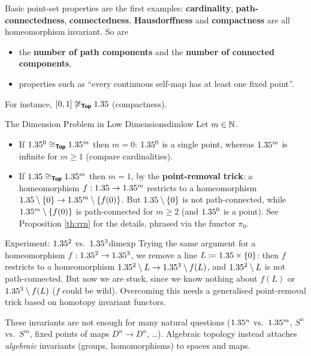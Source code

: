 Basic point-set properties are the first examples: \textbf{cardinality}, \textbf{path-connectedness}, \textbf{connectedness}, \textbf{Hausdorffness} and \textbf{compactness} are all homeomorphism invariant. So are
\begin{itemize}
    \item the \textbf{number of path components} and the \textbf{number of connected components},
    \item properties such as ``every continuous self-map has at least one fixed point''.
\end{itemize}
For instance, $[0,1]\not\cong_{\bm{\mathsf{Top}}}1.35$ (compactness).

\begin{example}{The Dimension Problem in Low Dimensions}{dimlow}
    Let $m\in\mathbb{N}$.
    \begin{itemize}
        \item If $1.35^0\cong_{\bm{\mathsf{Top}}}1.35^m$ then $m=0$: $1.35^0$ is a single point, whereas $1.35^m$ is infinite for $m\geq1$ (compare cardinalities).
        \item If $1.35\cong_{\bm{\mathsf{Top}}}1.35^m$ then $m=1$, by the \textbf{point-removal trick}: a homeomorphism $f:1.35\to1.35^m$ restricts to a homeomorphism $1.35\setminus\{0\}\to1.35^m\setminus\{f(0)\}$. But $1.35\setminus\{0\}$ is not path-connected, while $1.35^m\setminus\{f(0)\}$ is path-connected for $m\geq2$ (and $1.35^0$ is a point). See Proposition \ref{th:rrn} for the details, phrased via the functor $\pi_0$.
    \end{itemize}
\end{example}

\begin{remark}{Experiment: $1.35^2$ vs.\ $1.35^3$}{dimexp}
    Trying the same argument for a homeomorphism $f:1.35^2\to1.35^3$, we remove a line $L\coloneqq1.35\times\{0\}$: then $f$ restricts to a homeomorphism $1.35^2\setminus L\to1.35^3\setminus f(L)$, and $1.35^2\setminus L$ is not path-connected. But now we are stuck, since we know nothing about $f(L)$ or $1.35^3\setminus f(L)$ ($f$ could be wild). Overcoming this needs a generalised point-removal trick based on homotopy invariant functors.
\end{remark}

These invariants are not enough for many natural questions ($1.35^n$ vs.\ $1.35^m$, $S^n$ vs.\ $S^m$, fixed points of maps $D^n\to D^n$, \dots). Algebraic topology instead attaches \emph{algebraic} invariants (groups, homomorphisms) to spaces and maps.

\newpage
